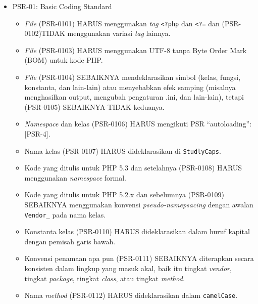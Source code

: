 \documentclass[a4paper,twoside]{article}
\begin{document}
\begin{enumerate}
\begin{enumerate}
			\begin{itemize}
				\item PSR-01: Basic Coding Standard
				\begin{itemize}
					\item \textit{File} (PSR-0101) HARUS menggunakan \textit{tag} \verb|<?php|  dan \verb|<?=| dan (PSR-0102)TIDAK menggunakan variasi \textit{tag} lainnya.
					\item \textit{File} (PSR-0103) HARUS menggunakan UTF-8 tanpa Byte Order Mark (BOM) untuk kode PHP.
					\item \textit{File} (PSR-0104) SEBAIKNYA mendeklarasikan simbol (kelas, fungsi, konstanta, dan lain-lain) atau menyebabkan efek samping (misalnya menghasilkan output, mengubah pengaturan .ini, dan lain-lain), tetapi (PSR-0105) SEBAIKNYA TIDAK keduanya.
					\item \textit{Namespace} dan kelas (PSR-0106) HARUS mengikuti PSR ``autoloading'': [PSR-4].
					\item Nama kelas (PSR-0107) HARUS dideklarasikan di \verb|StudlyCaps|.
					\item Kode yang ditulis untuk PHP 5.3 dan setelahnya (PSR-0108) HARUS menggunakan \textit{namespace} formal.
					\item Kode yang ditulis untuk PHP 5.2.x dan sebelumnya (PSR-0109) SEBAIKNYA menggunakan konvensi \textit{pseudo-namepsacing} dengan awalan  \verb|Vendor_|  pada nama kelas.
					\item Konstanta kelas (PSR-0110) HARUS dideklarasikan dalam huruf kapital dengan pemisah garis bawah.
					\item Konvensi penamaan apa pun (PSR-0111) SEBAIKNYA diterapkan secara konsisten dalam lingkup yang masuk akal, baik itu tingkat \textit{vendor}, tingkat \textit{package}, tingkat \textit{class}, atau tingkat \textit{method}.
					\item Nama \textit{method} (PSR-0112) HARUS dideklarasikan dalam \verb|camelCase|.
				\end{itemize}
				

\end{itemize}
\end{enumerate}
\end{enumerate}
\end{document}
